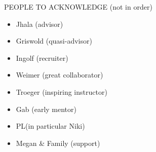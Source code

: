 \documentclass[12pt]{ucsddissertation}
\theoremstyle{plain}%
\theoremstyle{definition}
\begin{document}

\begin{acknowledgements}
PEOPLE TO ACKNOWLEDGE (not in order)
\begin{itemize}
\item Jhala (advisor)
\item Griswold (quasi-advisor)
\item Ingolf (recruiter)
\item Weimer (great collaborator)
\item Troeger (inspiring instructor)
\item Gab (early mentor)
\item PL\@UCSD (in particular Niki)
\item Megan \& Family (support)
\end{itemize}

\end{acknowledgements}
\end{document}
